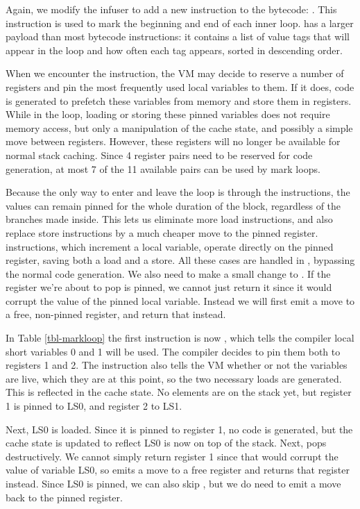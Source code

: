 Again, we modify the infuser to add a new instruction to the bytecode: . This instruction is used to mark the beginning and end of each inner loop.  has a larger payload than most bytecode instructions: it contains a list of value tags that will appear in the loop and how often each tag appears, sorted in descending order.

When we encounter the  instruction, the VM may decide to reserve a number of registers and pin the most frequently used local variables to them. If it does, code is generated to prefetch these variables from memory and store them in registers. While in the loop, loading or storing these pinned variables does not require memory access, but only a manipulation of the cache state, and possibly a simple move between registers. However, these registers will no longer be available for normal stack caching. Since 4 register pairs need to be reserved for code generation, at most 7 of the 11 available pairs can be used by mark loops.

Because the only way to enter and leave the loop is through the  instructions, the values can remain pinned for the whole duration of the block, regardless of the branches made inside. This lets us eliminate more load instructions, and also replace store instructions by a much cheaper move to the pinned register.  instructions, which increment a local variable, operate directly on the pinned register, saving both a load and a store. All these cases are handled in , bypassing the normal code generation. We also need to make a small change to . If the register we're about to pop is pinned, we cannot just return it since it would corrupt the value of the pinned local variable. Instead we will first emit a move to a free, non-pinned register, and return that instead.

In Table \ref{tbl-markloop} the first instruction is now , which tells the compiler local short variables 0 and 1 will be used. The compiler decides to pin them both to registers 1 and 2. The  instruction also tells the VM whether or not the variables are live, which they are at this point, so the two necessary loads are generated. This is reflected in the cache state. No elements are on the stack yet, but register 1 is pinned to LS0, and register 2 to LS1.

Next, LS0 is loaded. Since it is pinned to register 1, no code is generated, but the cache state is updated to reflect LS0 is now on top of the stack. Next,  pops destructively. We cannot simply return register 1 since that would corrupt the value of variable LS0, so  emits a move to a free register and returns that register instead. Since LS0 is pinned, we can also skip , but we do need to emit a move back to the pinned register.

